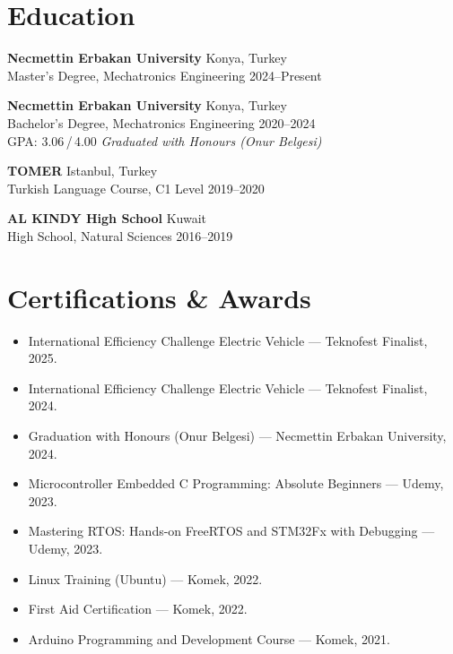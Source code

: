 \documentclass[a4paper,10pt]{article}
\begin{document}
\section*{Education}

\textbf{Necmettin Erbakan University} \hfill Konya, Turkey\\
Master's Degree, Mechatronics Engineering \hfill 2024--Present

\vspace{4pt}
\textbf{Necmettin Erbakan University} \hfill Konya, Turkey\\
Bachelor's Degree, Mechatronics Engineering \hfill 2020--2024\\
GPA: 3.06\,/\,4.00 \quad \textit{Graduated with Honours (Onur Belgesi)}

\vspace{4pt}
\textbf{TOMER} \hfill Istanbul, Turkey\\
Turkish Language Course, C1 Level \hfill 2019--2020

\vspace{4pt}
\textbf{AL KINDY High School} \hfill Kuwait\\
High School, Natural Sciences \hfill 2016--2019

\section*{Certifications \& Awards}
\begin{itemize}
  \item International Efficiency Challenge Electric Vehicle --- Teknofest Finalist, 2025.
  \item International Efficiency Challenge Electric Vehicle --- Teknofest Finalist, 2024.
  \item Graduation with Honours (Onur Belgesi) --- Necmettin Erbakan University, 2024.
  \item Microcontroller Embedded C Programming: Absolute Beginners --- Udemy, 2023.
  \item Mastering RTOS: Hands-on FreeRTOS and STM32Fx with Debugging --- Udemy, 2023.
  \item Linux Training (Ubuntu) --- Komek, 2022.
  \item First Aid Certification --- Komek, 2022.
  \item Arduino Programming and Development Course --- Komek, 2021.
\end{itemize}
\end{document}
